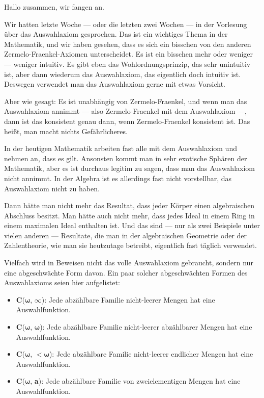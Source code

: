 \begin{spoken-clean}[00:00:00 - 00:01:55]
Hallo zusammen, wir fangen an.

Wir hatten letzte Woche --- oder die letzten zwei Wochen --- in der Vorlesung über das Auswahlaxiom gesprochen. Das ist ein wichtiges Thema in der Mathematik, und wir haben gesehen, dass es sich ein bisschen von den anderen Zermelo-Fraenkel-Axiomen unterscheidet. Es ist ein bisschen mehr oder weniger --- weniger intuitiv. Es gibt eben das Wohlordnungsprinzip, das sehr unintuitiv ist, aber dann wiederum das Auswahlaxiom, das eigentlich doch intuitiv ist. Deswegen verwendet man das Auswahlaxiom gerne mit etwas Vorsicht.

Aber wie gesagt: Es ist unabhängig von Zermelo-Fraenkel, und wenn man das Auswahlaxiom annimmt --- also Zermelo-Fraenkel mit dem Auswahlaxiom ---, dann ist das konsistent genau dann, wenn Zermelo-Fraenkel konsistent ist. Das heißt, man macht nichts Gefährlicheres.
\end{spoken-clean}

\begin{spoken-clean}[00:01:55 - 00:05:57]
In der heutigen Mathematik arbeiten fast alle mit dem Auswahlaxiom und nehmen an, dass es gilt. Ansonsten kommt man in sehr exotische Sphären der Mathematik, aber es ist durchaus legitim zu sagen, dass man das Auswahlaxiom nicht annimmt. In der Algebra ist es allerdings fast nicht vorstellbar, das Auswahlaxiom nicht zu haben.

Dann hätte man nicht mehr das Resultat, dass jeder Körper einen algebraischen Abschluss besitzt. Man hätte auch nicht mehr, dass jedes Ideal in einem Ring in einem maximalen Ideal enthalten ist. Und das sind --- nur als zwei Beispiele unter vielen anderen --- Resultate, die man in der algebraischen Geometrie oder der Zahlentheorie, wie man sie heutzutage betreibt, eigentlich fast täglich verwendet.
\end{spoken-clean}

\begin{nice-box}
Vielfach wird in Beweisen nicht das volle Auswahlaxiom gebraucht, sondern nur eine abgeschwächte Form davon. Ein paar solcher abgeschwächten Formen des Auswahlaxioms seien hier aufgelistet:
\begin{itemize}
    \item \textbf{C}($\boldsymbol{\omega}$, $\boldsymbol{\infty}$): Jede abzählbare Familie nicht-leerer Mengen hat eine Auswahlfunktion.
    \item \textbf{C}($\boldsymbol{\omega}$, $\boldsymbol{\omega}$): Jede abzählbare Familie nicht-leerer abzählbarer Mengen hat eine Auswahlfunktion.
    \item \textbf{C}($\boldsymbol{\omega}$, $\boldsymbol{<\omega}$): Jede abzählbare Familie nicht-leerer endlicher Mengen hat eine Auswahlfunktion.
    \item \textbf{C}($\boldsymbol{\omega}$, \textbf{a}): Jede abzählbare Familie von zweielementigen Mengen hat eine Auswahlfunktion.
\end{itemize}
\end{nice-box}

